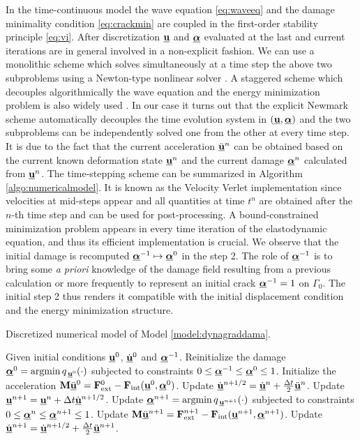 In the time-continuous model the wave equation \eqref{eq:waveeq} and the damage minimality condition \eqref{eq:crackmin} are coupled in the first-order stability principle \eqref{eq:vi}. After discretization $\uvec$ and $\dvec$ evaluated at the last and current iterations are in general involved in a non-explicit fashion. We can use a monolithic scheme which solves simultaneously at a time step the above two subproblems using a Newton-type nonlinear solver \cite{BordenVerhooselScottHughesLandis:2012,SchlueterWillenbuecherKuhnMueller:2014}. A staggered scheme which decouples algorithmically the wave equation and the energy minimization problem is also widely used \cite{Bourdin:2011,HofackerMiehe:2012}. In our case it turns out that the explicit Newmark scheme automatically decouples the time evolution system in $(\uvec,\dvec)$ and the two subproblems can be independently solved one from the other at every time step. It is due to the fact that the current acceleration $\ddot{\uvec}^n$ can be obtained based on the current known deformation state $\uvec^n$ and the current damage $\dvec^n$ calculated from $\uvec^n$. The time-stepping scheme can be summarized in Algorithm \ref{algo:numericalmodel}. It is known as the Velocity Verlet implementation since velocities at mid-steps appear and all quantities at time $t^n$ are obtained after the $n$-th time step and can be used for post-processing. A bound-constrained minimization problem appears in every time iteration of the elastodynamic equation, and thus its efficient implementation is crucial. We observe that the initial damage is recomputed $\dvec^{-1}\mapsto\dvec^0$ in the step 2. The role of $\dvec^{-1}$ is to bring some \emph{a priori} knowledge of the damage field resulting from a previous calculation or more frequently to represent an initial crack $\dvec^{-1}=1$ on $\Gamma_0$. The initial step 2 thus renders it compatible with the initial displacement condition and the energy minimization structure.
\begin{algorithm*}[htbp]
\caption{Discretized numerical model of Model \ref{model:dynagraddama}.} \label{algo:numericalmodel}
\begin{algorithmic}[1]\linespread{1.2}\selectfont\normalsize
\State Given initial conditions $\uvec^0$, $\dot{\uvec}^0$ and $\dvec^{-1}$.
\State Reinitialize the damage $\dvec^0=\operatorname{arg min}q_{\,\uvec^0}(\cdot)$ subjected to constraints $0\leq\dvec^{-1}\leq\dvec^0\leq 1$.
\State Initialize the acceleration $\vec{M}\ddot{\uvec}^0=\vec{F}_\mathrm{ext}^0-\vec{F}_\mathrm{int}(\uvec^0,\dvec^0)$.
  \State Update $\dot{\uvec}^{n+1/2}=\dot{\uvec}^{n}+\frac{\Delta t}{2}\ddot{\uvec}^n$.
  \State Update $\uvec^{n+1}=\uvec^n+\Delta t\dot{\uvec}^{n+1/2}$.
  \State Update $\dvec^{n+1}=\operatorname{arg min}q_{\,\uvec^{n+1}}(\cdot)$ subjected to constraints $0\leq\dvec^n\leq\dvec^{n+1}\leq 1$.
  \State Update $\vec{M}\ddot{\uvec}^{n+1}=\vec{F}_\mathrm{ext}^{n+1}-\vec{F}_\mathrm{int}(\uvec^{n+1},\dvec^{n+1})$.
  \State Update $\dot{\uvec}^{n+1}=\dot{\uvec}^{n+1/2}+\frac{\Delta t}{2}\ddot{\uvec}^{n+1}$.
\EndFor
\end{algorithmic}
\end{algorithm*}

